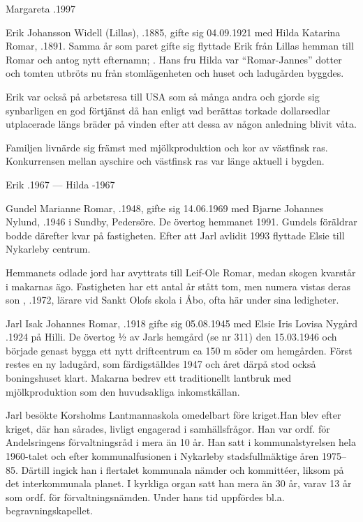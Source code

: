 Margareta .1997


Erik Johansson Widell (Lillas), .1885, gifte sig 04.09.1921 med Hilda Katarina Romar, .1891. Samma år som paret gifte sig flyttade Erik från Lillas hemman till Romar och antog nytt efternamn; . Hans fru Hilda var ``Romar-Jannes'' dotter och tomten utbröts nu från stomlägenheten och huset och ladugården byggdes.

Erik var också på arbetsresa till USA som så många andra och gjorde sig synbarligen en god förtjänst då han enligt vad berättas torkade
dollarsedlar utplacerade längs bräder på vinden efter att dessa av någon anledning blivit våta.

Familjen livnärde sig främst med mjölkproduktion och kor av västfinsk ras. Konkurrensen mellan ayschire och västfinsk ras var länge aktuell i bygden.

Erik .1967  ---  Hilda -1967






Gundel Marianne Romar, .1948, gifte sig 14.06.1969 med Bjarne Johannes Nylund, .1946 i Sundby, Pedersöre. De övertog hemmanet 1991. Gundels föräldrar bodde därefter kvar på fastigheten. Efter att Jarl avlidit 1993 flyttade Elsie till Nykarleby centrum.

Hemmanets odlade jord har avyttrats till Leif-Ole Romar, medan skogen kvarstår i makarnas ägo. Fastigheten har ett antal år stått tom, men numera vistas deras son , .1972, lärare vid Sankt Olofs skola i  Åbo, ofta här under sina ledigheter.


Jarl Isak Johannes Romar, .1918 gifte sig 05.08.1945 med Elsie Iris Lovisa Nygård .1924 på Hilli. De övertog ½ av Jarls hemgård (se nr 311) den 15.03.1946 och började genast bygga ett nytt driftcentrum ca 150 m söder om hemgården. Först restes en ny ladugård, som färdigställdes 1947 och året därpå stod också boningshuset klart. Makarna bedrev ett traditionellt lantbruk med mjölkproduktion som den huvudsakliga inkomstkällan.

Jarl besökte Korsholms Lantmannaskola omedelbart före kriget.Han blev efter kriget, där han sårades, livligt engagerad i samhällsfrågor. Han var ordf. för Andelsringens förvaltningsråd i mera än 10 år. Han satt i kommunalstyrelsen hela 1960-talet och efter kommunalfusionen i Nykarleby stadsfullmäktige åren 1975--85. Därtill ingick han i flertalet kommunala nämder och kommittéer, liksom på det interkommunala planet. I kyrkliga organ satt han mera än 30 år, varav 13 år som ordf. för förvaltningsnämden. Under hans tid uppfördes bl.a. begravningskapellet.


